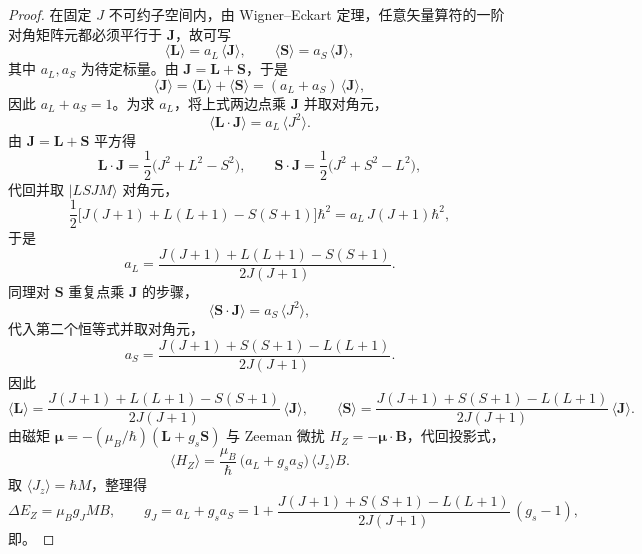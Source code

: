 \begin{proof}
在固定 $J$ 不可约子空间内，由 Wigner--Eckart 定理，任意矢量算符的一阶对角矩阵元都必须平行于 $\mathbf J$，故可写
\begin{equation*}
\langle\mathbf L\rangle = a_L\,\langle\mathbf J\rangle,
\qquad
\langle\mathbf S\rangle = a_S\,\langle\mathbf J\rangle,
\end{equation*}
其中 $a_L,a_S$ 为待定标量。由 $\mathbf J=\mathbf L+\mathbf S$，于是
\begin{equation*}
\langle\mathbf J\rangle
= \langle\mathbf L\rangle+\langle\mathbf S\rangle
= (a_L+a_S)\,\langle\mathbf J\rangle,
\end{equation*}
因此 $a_L+a_S=1$。为求 $a_L$，将上式两边点乘 $\mathbf J$ 并取对角元，
\begin{equation*}
\langle\mathbf L\cdot\mathbf J\rangle
= a_L\,\langle J^2\rangle.
\end{equation*}
由 $\mathbf J=\mathbf L+\mathbf S$ 平方得
\begin{equation*}
\mathbf L\cdot\mathbf J
= \frac12\bigl(J^2+L^2-S^2\bigr),
\qquad
\mathbf S\cdot\mathbf J
= \frac12\bigl(J^2+S^2-L^2\bigr),
\end{equation*}
代回并取 $|LSJM\rangle$ 对角元，
\begin{equation*}
\frac12\bigl[J(J+1)+L(L+1)-S(S+1)\bigr]\hbar^2
= a_L\,J(J+1)\hbar^2,
\end{equation*}
于是
\begin{equation*}
a_L
= \frac{J(J+1)+L(L+1)-S(S+1)}{2J(J+1)}.
\end{equation*}
同理对 $\mathbf S$ 重复点乘 $\mathbf J$ 的步骤，
\begin{equation*}
\langle\mathbf S\cdot\mathbf J\rangle
= a_S\,\langle J^2\rangle,
\end{equation*}
代入第二个恒等式并取对角元，
\begin{equation*}
a_S
= \frac{J(J+1)+S(S+1)-L(L+1)}{2J(J+1)}.
\end{equation*}
因此
\begin{equation*}
\langle\mathbf L\rangle
= \frac{J(J+1)+L(L+1)-S(S+1)}{2J(J+1)}\,\langle\mathbf J\rangle,
\qquad
\langle\mathbf S\rangle
= \frac{J(J+1)+S(S+1)-L(L+1)}{2J(J+1)}\,\langle\mathbf J\rangle.
\end{equation*}
由磁矩 $\boldsymbol\mu=-(\mu_B/\hbar)(\mathbf L+g_s\mathbf S)$ 与 Zeeman 微扰 $H_Z=-\boldsymbol\mu\cdot\mathbf B$，代回投影式，
\begin{equation*}
\langle H_Z\rangle
= \frac{\mu_B}{\hbar}\,\bigl(a_L+g_s a_S\bigr)\,\langle J_z\rangle B.
\end{equation*}
取 $\langle J_z\rangle=\hbar M$，整理得
\begin{equation*}
\Delta E_Z = \mu_B g_J M B,
\qquad
g_J = a_L+g_s a_S
= 1+\frac{J(J+1)+S(S+1)-L(L+1)}{2J(J+1)}\,(g_s-1),
\end{equation*}
即。
\end{proof}

